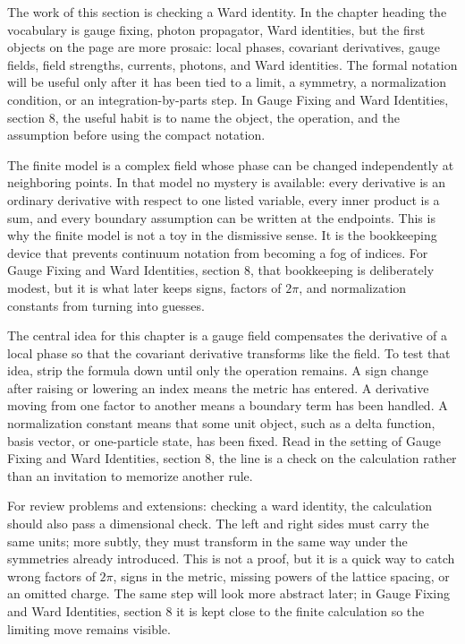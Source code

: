 The work of this section is checking a Ward identity.  In the chapter heading the vocabulary is gauge fixing, photon propagator, Ward identities, but the first objects on the page are more prosaic: local phases, covariant derivatives, gauge fields, field strengths, currents, photons, and Ward identities.  The formal notation will be useful only after it has been tied to a limit, a symmetry, a normalization condition, or an integration-by-parts step.  In Gauge Fixing and Ward Identities, section 8, the useful habit is to name the object, the operation, and the assumption before using the compact notation.

The finite model is a complex field whose phase can be changed independently at neighboring points.  In that model no mystery is available: every derivative is an ordinary derivative with respect to one listed variable, every inner product is a sum, and every boundary assumption can be written at the endpoints.  This is why the finite model is not a toy in the dismissive sense.  It is the bookkeeping device that prevents continuum notation from becoming a fog of indices.  For Gauge Fixing and Ward Identities, section 8, that bookkeeping is deliberately modest, but it is what later keeps signs, factors of \(2\pi\), and normalization constants from turning into guesses.

The central idea for this chapter is a gauge field compensates the derivative of a local phase so that the covariant derivative transforms like the field.  To test that idea, strip the formula down until only the operation remains.  A sign change after raising or lowering an index means the metric has entered.  A derivative moving from one factor to another means a boundary term has been handled.  A normalization constant means that some unit object, such as a delta function, basis vector, or one-particle state, has been fixed.  Read in the setting of Gauge Fixing and Ward Identities, section 8, the line is a check on the calculation rather than an invitation to memorize another rule.

For review problems and extensions: checking a ward identity, the calculation should also pass a dimensional check.  The left and right sides must carry the same units; more subtly, they must transform in the same way under the symmetries already introduced.  This is not a proof, but it is a quick way to catch wrong factors of \(2\pi\), signs in the metric, missing powers of the lattice spacing, or an omitted charge.  The same step will look more abstract later; in Gauge Fixing and Ward Identities, section 8 it is kept close to the finite calculation so the limiting move remains visible.

